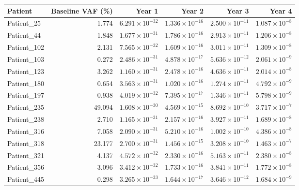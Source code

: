 \begin{center}\small\begin{tabular}{lrrrrr}\toprule Patient & Baseline VAF (\%) & Year 1 & Year 2 & Year 3 & Year 4\\\midrule

Patient\_25 & 1.774 & $6.291\times10^{-32}$ & $1.336\times10^{-16}$ & $2.500\times10^{-11}$ & $1.087\times10^{-8}$\\

Patient\_44 & 1.848 & $1.677\times10^{-31}$ & $1.786\times10^{-16}$ & $2.913\times10^{-11}$ & $1.206\times10^{-8}$\\

Patient\_102 & 2.131 & $7.565\times10^{-32}$ & $1.609\times10^{-16}$ & $3.011\times10^{-11}$ & $1.309\times10^{-8}$\\

Patient\_103 & 0.272 & $2.486\times10^{-31}$ & $4.878\times10^{-17}$ & $5.636\times10^{-12}$ & $2.061\times10^{-9}$\\

Patient\_123 & 3.262 & $1.160\times10^{-31}$ & $2.478\times10^{-16}$ & $4.636\times10^{-11}$ & $2.014\times10^{-8}$\\

Patient\_180 & 0.654 & $3.563\times10^{-31}$ & $1.020\times10^{-16}$ & $1.274\times10^{-11}$ & $4.792\times10^{-9}$\\

Patient\_197 & 0.938 & $4.019\times10^{-32}$ & $7.395\times10^{-17}$ & $1.346\times10^{-11}$ & $5.798\times10^{-9}$\\

Patient\_235 & 49.094 & $1.608\times10^{-30}$ & $4.569\times10^{-15}$ & $8.692\times10^{-10}$ & $3.717\times10^{-7}$\\

Patient\_238 & 2.710 & $1.165\times10^{-31}$ & $2.157\times10^{-16}$ & $3.927\times10^{-11}$ & $1.689\times10^{-8}$\\

Patient\_316 & 7.058 & $2.090\times10^{-31}$ & $5.210\times10^{-16}$ & $1.002\times10^{-10}$ & $4.386\times10^{-8}$\\

Patient\_318 & 23.177 & $2.700\times10^{-31}$ & $1.456\times10^{-15}$ & $3.208\times10^{-10}$ & $1.463\times10^{-7}$\\

Patient\_321 & 4.137 & $4.572\times10^{-32}$ & $2.330\times10^{-16}$ & $5.163\times10^{-11}$ & $2.380\times10^{-8}$\\

Patient\_356 & 3.096 & $3.412\times10^{-32}$ & $1.733\times10^{-16}$ & $3.841\times10^{-11}$ & $1.772\times10^{-8}$\\

Patient\_445 & 0.298 & $3.265\times10^{-33}$ & $1.644\times10^{-17}$ & $3.646\times10^{-12}$ & $1.684\times10^{-9}$\\

\bottomrule\end{tabular}\end{center}

